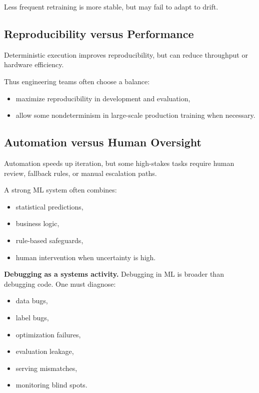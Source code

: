 \medskip

\noindent
Less frequent retraining is more stable, but may fail to adapt to drift.

\subsection{Reproducibility versus Performance}

Deterministic execution improves reproducibility, but can reduce throughput or hardware efficiency.

\medskip

\noindent
Thus engineering teams often choose a balance:
\begin{itemize}
    \item maximize reproducibility in development and evaluation,
    \item allow some nondeterminism in large-scale production training when necessary.
\end{itemize}

\subsection{Automation versus Human Oversight}

Automation speeds up iteration, but some high-stakes tasks require human review, fallback rules, or manual escalation paths.

\medskip

\noindent
A strong ML system often combines:
\begin{itemize}
    \item statistical predictions,
    \item business logic,
    \item rule-based safeguards,
    \item human intervention when uncertainty is high.
\end{itemize}

\medskip

\noindent
\textbf{Debugging as a systems activity.}
Debugging in ML is broader than debugging code. One must diagnose:
\begin{itemize}
    \item data bugs,
    \item label bugs,
    \item optimization failures,
    \item evaluation leakage,
    \item serving mismatches,
    \item monitoring blind spots.
\end{itemize}

